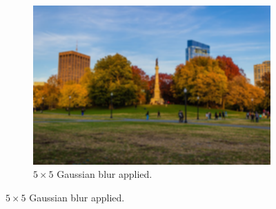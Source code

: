 \begin{example}
\begin{figure}[H]
\begin{subfigure}[b]{0.32\textwidth}
      \centering
          \includegraphics[width=\textwidth]{img/03_CNN/Gaussian_Blur.png}
          \caption{$5 \times 5$ Gaussian blur applied. }
          \label{fig:normal_blur_image}
      \end{subfigure}
      

\end{figure}
\end{example}
